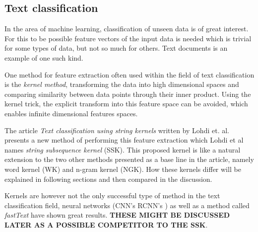 \subsection*{Text classification}
In the area of machine learning, classification of unseen data is of great interest. For this to be possible feature vectors of the input data is needed which is trivial for some types of data, but not so much for others. Text documents is an example of one such kind. 

One method for feature extraction often used within the field of text classification is the \textit{kernel method}, transforming the data into high dimensional spaces and comparing similarity between data points through their inner product. Using the kernel trick, the explicit transform into this feature space can be avoided, which enables infinite dimensional features spaces. 

The article \textit{Text classification using string kernels} written by Lohdi et. al. presents a new method of performing this feature extraction which Lohdi et al names \textit{string subsequence kernel} (SSK). This proposed kernel is like a natural extension to the two other methods presented as a base line in the article, namely word kernel (WK) and n-gram kernel (NGK). How these kernels differ will be explained in following sections and then compared in the discussion. 

Kernels are however not the only successful type of method in the text classification field, neural networks (CNN's RCNN's ) as well as a method called \textit{fastText} have shown great results. \textbf{THESE MIGHT BE DISCUSSED LATER AS A POSSIBLE COMPETITOR TO THE SSK}.


